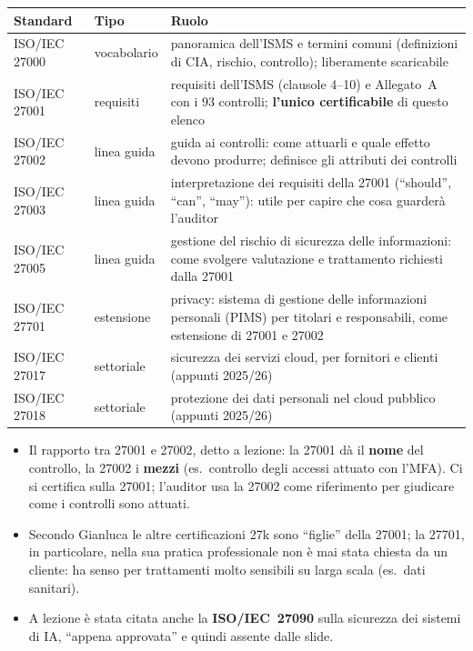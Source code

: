 \begin{center}
\small
\begin{tabularx}{\linewidth}{>{\raggedright\arraybackslash}p{2.5cm} >{\raggedright\arraybackslash}p{2.6cm} X}
\toprule
\textbf{Standard} & \textbf{Tipo} & \textbf{Ruolo}\\
\midrule
ISO/IEC 27000 & vocabolario & panoramica dell'ISMS e termini comuni (definizioni di CIA, rischio, controllo);
  liberamente scaricabile\\
ISO/IEC 27001 & requisiti & requisiti dell'ISMS (clausole 4--10) e Allegato~A con i 93 controlli;
  \textbf{l'unico certificabile} di questo elenco\\
ISO/IEC 27002 & linea guida & guida ai controlli: come attuarli e quale effetto devono produrre; definisce
  gli attributi dei controlli\\
ISO/IEC 27003 & linea guida & interpretazione dei requisiti della 27001 (``should'', ``can'', ``may''): utile
  per capire che cosa guarderà l'auditor\\
ISO/IEC 27005 & linea guida & gestione del rischio di sicurezza delle informazioni: come svolgere
  valutazione e trattamento richiesti dalla 27001\\
ISO/IEC 27701 & estensione & privacy: sistema di gestione delle informazioni personali (PIMS) per titolari e
  responsabili, come estensione di 27001 e 27002\\
ISO/IEC 27017 & settoriale & sicurezza dei servizi cloud, per fornitori e clienti (appunti 2025/26)\\
ISO/IEC 27018 & settoriale & protezione dei dati personali nel cloud pubblico (appunti 2025/26)\\
\bottomrule
\end{tabularx}
\end{center}

\begin{itemize}
  \item Il rapporto tra 27001 e 27002, detto a lezione: la 27001 dà il \textbf{nome} del controllo, la 27002
    i \textbf{mezzi} (es.\ controllo degli accessi attuato con l'MFA). Ci si certifica sulla 27001; l'auditor
    usa la 27002 come riferimento per giudicare come i controlli sono attuati.
  \item Secondo Gianluca le altre certificazioni 27k sono ``figlie'' della 27001; la 27701, in particolare,
    nella sua pratica professionale non è mai stata chiesta da un cliente: ha senso per trattamenti molto
    sensibili su larga scala (es.\ dati sanitari).
  \item A lezione è stata citata anche la \textbf{ISO/IEC~27090} sulla sicurezza dei sistemi di IA,
    ``appena approvata'' e quindi assente dalle slide.
\end{itemize}

